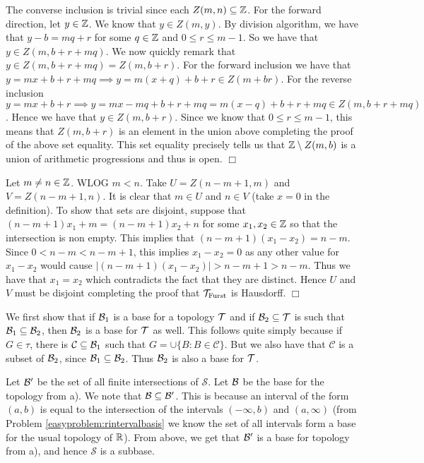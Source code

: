\documentclass{article}
\begin{document}
{\begin{spacedenumerate}
    The converse inclusion is trivial since each $Z(m,n)\subseteq \mathbb{Z}$. For the forward direction, let $y\in \mathbb{Z}$. We know that $y\in Z(m,y)$. By division algorithm, we have that $y-b = mq+r$ for some $q\in \mathbb{Z}$ and $0\leq r \leq m-1$. So we have that $y \in Z(m, b + r + mq)$. We now quickly remark that  $y \in Z(m, b + r + mq) = Z(m,b+r)$. For the forward inclusion we have that $y = mx + b+r+mq \implies y = m(x+q) + b+r\in Z(m+br)$. For the reverse inclusion $y = mx + b + r \implies y = mx - mq + b + r + mq = m(x-q) + b + r + mq \in Z(m, b + r + mq)$. Hence we have that $y\in Z(m,b+r)$. Since we know that $0\leq r \leq m-1$, this means that $Z(m,b+r)$ is an element in the union above completing the proof of the above set equality. This set equality precisely tells us that $\mathbb{Z}\setminus Z(m,b)$ is a union of arithmetic progressions and thus is open. $\Box$
    \item Let $m\neq n\in \mathbb{Z}$. WLOG $m < n$. Take $U = Z(n-m+1, m)$ and $V = Z(n-m+1, n)$. It is clear that $m\in U$ and $n\in V$ (take $x = 0$ in the definition). To show that sets are disjoint, suppose that $(n-m+1)x_{1} + m = (n-m+1)x_{2} + n$ for some $x_{1}, x_{2}\in \mathbb{Z}$ so that the intersection is non empty. This implies that $(n-m+1)(x_{1}-x_{2}) = n-m$. Since $0 < n-m < n-m+1$, this implies $x_{1}-x_{2} = 0$ as any other value for $x_{1}-x_{2}$ would cause $\lvert (n-m+1)(x_{1}-x_{2})\rvert > n-m+1 > n-m$. Thus we have that $x_{1} = x_{2}$ which contradicts the fact that they are distinct. Hence $U$ and $V$ must be disjoint completing the proof that $\mathcal{T}_{\text{Furst}}$ is Hausdorff. $\Box$
\end{spacedenumerate}
}
 {
    We first show that if $\mathcal{B}_{1}$ is a base for a topology $\mathcal{T}$ and if $\mathcal{B}_{2}\subseteq \mathcal{T}$ is such that $\mathcal{B}_{1}\subseteq \mathcal{B}_{2}$, then $\mathcal{B}_{2}$ is a base for $\mathcal{T}$ as well. This follows quite simply because if $G\in\tau$, there is $\mathcal{C}\subseteq \mathcal{B}_{1}$ such that  $G = \cup\{B : B\in \mathcal{C}\}$. But we also have that $\mathcal{C}$ is a subset of $\mathcal{B}_{2}$, since $\mathcal{B}_{1}\subseteq \mathcal{B}_{2}$. Thus $\mathcal{B}_{2}$ is also a base for $\mathcal{T}$.

    Let $\mathcal{B}'$ be the set of all finite intersections of $\mathcal{S}$. Let $\mathcal{B}$ be the base for the topology from a). We note that $\mathcal{B}\subseteq \mathcal{B}'$. This is because an interval of the form $(a,b)$ is equal to the intersection of the intervals $(-\infty, b)$ and $(a,\infty)$ (from Problem \ref{easyproblem:rintervalbasis} we know the set of all intervals form a base for the usual topology of $\mathbb{R}$). From above, we get that $\mathcal{B}'$ is a base for topology from a), and hence $\mathcal{S}$ is a subbase.
}
\end{document}

